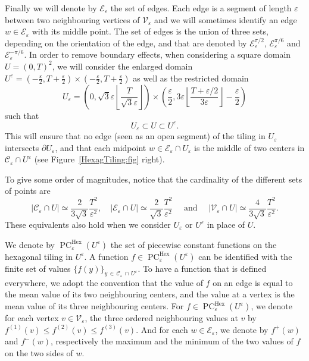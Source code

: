 \documentclass[10pt]{amsart}
\theoremstyle{definition}\newtheorem{defi}[theo]{Definition}\newtheorem{rema}[theo]{Remark}\newtheorem{exam}[theo]{Example}\newtheorem{exem}[theo]{Example}\newtheorem{nota}[theo]{Notation}
\newcommand{\eps}{\varepsilon}
\DeclareMathOperator{\PC}{PC}
\DeclareMathOperator{\Hex}{Hex}
\newcommand{\calC}{\mathcal{C}}
\newcommand{\calV}{\mathcal{V}}
\newcommand{\calE}{\mathcal{E}}
\begin{document}
Finally we will denote by $\calE_\eps$ the set of edges. Each edge is a segment of length $\eps$ between two neighbouring vertices of $\calV_\eps$ and we will sometimes identify an edge $w\in\calE_\eps$ with its middle point. The set of edges is the union of three sets, depending on the orientation of the edge, and that are denoted by $\calE_\eps^{\pi/2}$, $\calE_\eps^{\pi/6}$ and $\calE_\eps^{-\pi/6}$. In order to remove boundary effects, when considering a square domain $U=(0,T)^2$, we will consider the enlarged domain $U^{\eps}=(-\tfrac{\eps}{2},T+\tfrac{\eps}{2})\times (-\tfrac{\eps}{2},T+\tfrac{\eps}{2})$ as well as the restricted domain
\[
U_\eps=\left(0,\sqrt{3}\eps
\left\lfloor \frac{T}{\sqrt{3}\eps}\right\rfloor\right)\times
\left(\frac{\eps}{2},3\eps\left\lfloor\frac{T+\eps/2}{{3}\eps}\right\rfloor-\frac{\eps}{2}\right)
\]
such that
\[
U_\eps\subset U\subset U^{\eps}.
\]
This will ensure that no
edge (seen as an open segment) of the tiling in $U_\eps$ intersects $\partial U_\eps$, and that each midpoint $w\in \calE_\eps \cap U_\eps$ is the middle of two centers in ${\calC}_\eps\cap U^{\eps}$ (see Figure~\ref{HexagTiling:fig} right).

To give some order of magnitudes, notice that the cardinality of the different sets of points are
\[
\left|\calC_\eps \cap U \right|\simeq \frac{2}{3\sqrt{3}} \frac{T^2}{\eps^2}, \quad
\left|\calE_\eps \cap U \right|\simeq \frac{2}{\sqrt{3}} \frac{T^2}{\eps^2}
\quad \text{ and } \quad \left|\calV_\eps \cap U \right|\simeq \frac{4}{3\sqrt{3}} \frac{T^2}{\eps^2}.
\]
These equivalents also hold when we consider $U_\eps$ or $U^\eps$ in place of $U$.


We denote by $\PC^{\Hex}_\eps(U^{\eps})$ the set of piecewise constant functions on the hexagonal tiling in $U^{\eps}$. A function $f\in
\PC^{\Hex}_\eps(U^{\eps})$ can be identified with the finite set of values $\{ f(y)\}_{y\,\in\,\calC_\eps\, \cap\,U^{\eps}}$. To have a function that is defined everywhere, we adopt the convention that the value of $f$ on an edge is equal to the mean value of its two neighbouring centers, and the value at a vertex is the mean value of its three neighbouring centers. For $f\in \PC^{\Hex}_\eps(U^{\eps})$, we denote for each vertex $v\in {\calV}_\varepsilon$, the three ordered neighbouring values at $v$ by $f^{(1)}(v)\le f^{(2)}(v)\le f^{(3)}(v)$. And for each $w\in\calE_\eps$, we denote by $f^+(w)$ and $f^-(w)$, respectively the maximum and the minimum of the two values of $f$ on the two sides of $w$.
\end{document}
